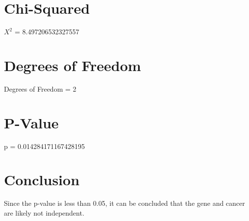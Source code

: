 \documentclass[11pt,english]{article}
\begin{document}
\section{Chi-Squared}
$X^2$ = 8.497206532327557

\section{Degrees of Freedom}
Degrees of Freedom = 2

\section{P-Value}
p = 0.014284171167428195

\section{Conclusion}
Since the p-value is less than 0.05, it can be concluded that the gene and cancer are likely not independent.
\end{document}
